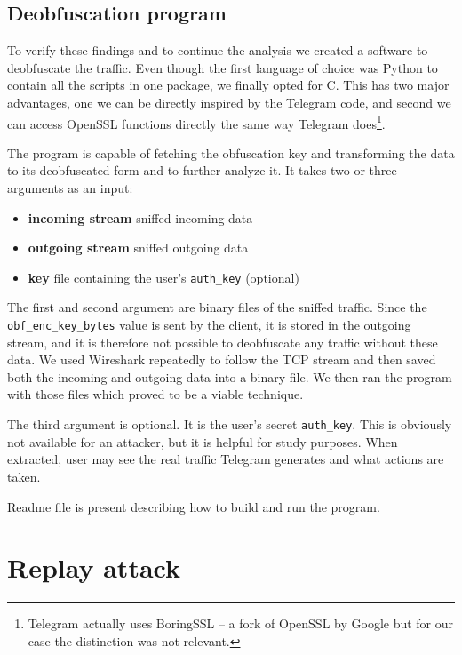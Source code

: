 \documentclass[thesis=M,english]{FITthesis}[2012/10/20]
\newcommand{\cpp}{C\nolinebreak\hspace{-.05em}\raisebox{.4ex}{\tiny +}\nolinebreak\hspace{-.10em}\raisebox{.4ex}{\tiny +}}
\begin{document}
\subsection{Deobfuscation program}\label{analysis-obf-program}

To verify these findings and to continue the analysis we created a software to deobfuscate the traffic. Even though the first language of choice was Python to contain all the scripts in one package, we finally opted for \cpp. This has two major advantages, one we can be directly inspired by the Telegram code, and second we can access OpenSSL functions directly the same way Telegram does\footnote{Telegram actually uses BoringSSL -- a fork of OpenSSL by Google but for our case the distinction was not relevant.}.

The program is capable of fetching the obfuscation key and transforming the data to its deobfuscated form and to further analyze it. It takes two or three arguments as an input:

\begin{itemize}

	\item \textbf{incoming stream} sniffed incoming data
	\item \textbf{outgoing stream} sniffed outgoing data
	\item \textbf{key} file containing the user's \texttt{auth\_key} (optional)

\end{itemize}

The first and second argument are binary files of the sniffed traffic. Since the \texttt{obf\_enc\_key\_bytes} value is sent by the client, it is stored in the outgoing stream, and it is therefore not possible to deobfuscate any traffic without these data. We used Wireshark repeatedly to follow the TCP stream and then saved both the incoming and outgoing data into a binary file. We then ran the program with those files which proved to be a viable technique.

The third argument is optional. It is the user's secret \texttt{auth\_key}. This is obviously not available for an attacker, but it is helpful for study purposes. When extracted, user may see the real traffic Telegram generates and what actions are taken.

Readme file is present describing how to build and run the program.



\section{Replay attack}\label{analysis-attacks}
\end{document}
